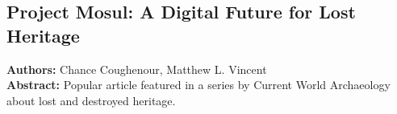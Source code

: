\subsection{Project Mosul: A Digital Future for Lost Heritage}

\textbf{Authors:}  Chance Coughenour, Matthew L. Vincent
\\
\textbf{Abstract:} Popular article featured in a series by Current World Archaeology about lost and destroyed heritage.

